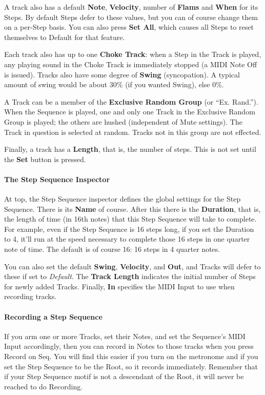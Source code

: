 \documentclass[twoside,10pt]{article}
\begin{document}
A track also has a default {\bf Note}, {\bf Velocity}, number of {\bf Flams} and {\bf When} for its Steps.  By default Steps defer to these values, but you can of course change them on a per-Step basis.  You can also press {\bf Set All}, which causes all Steps to reset themselves to Default for that feature.

Each track also has up to one {\bf Choke Track}: when a Step in the Track is played, any playing sound in the Choke Track is immediately stopped (a MIDI Note Off is issued).  Tracks also have some degree of {\bf Swing} (syncopation).  A typical amount of swing would be about 30\% (if you wanted Swing), else 0\%.

A Track can be a member of the {\bf Exclusive Random Group} (or ``Ex. Rand.'').  When the Sequence is played, one and only one Track in the Exclusive Random Group is played; the others are hushed (independent of Mute settings).  The Track in question is selected at random. Tracks not in this group are not effected.

Finally, a track has a {\bf Length}, that is, the number of steps.  This is not set until the {\bf Set} button is pressed.

\paragraph{The Step Sequence Inspector}

At top, the Step Sequence inspector defines the global settings for the Step Sequence.  There is its {\bf Name} of course.  After this there is the {\bf Duration}, that is, the length of time (in 16th notes) that this Step Sequence will take to complete.  For example, even if the Step Sequence is 16 steps long, if you set the Duration to 4, it'll run at the speed necessary to complete those 16 steps in one quarter note of time.  The default is of course 16: 16 steps in 4 quarter notes.

You can also set the default {\bf Swing}, {\bf Velocity}, and {\bf Out}, and Tracks will defer to these if set to {\it Default}.  The {\bf Track Length} indicates the initial number of Steps for newly added Tracks. Finally, {\bf In} specifies the MIDI Input to use when recording tracks.

\paragraph{Recording a Step Sequence}

If you arm one or more Tracks, set their Notes, and set the Sequence's MIDI Input accordingly, then you can record in Notes to those tracks when you press Record on Seq.   You will find this easier if you turn on the metronome and if you set the Step Sequence to be the Root, so it records immediately.  Remember that if your Step Sequence motif is not a descendant of the Root, it will never be reached to do Recording.
\end{document}
